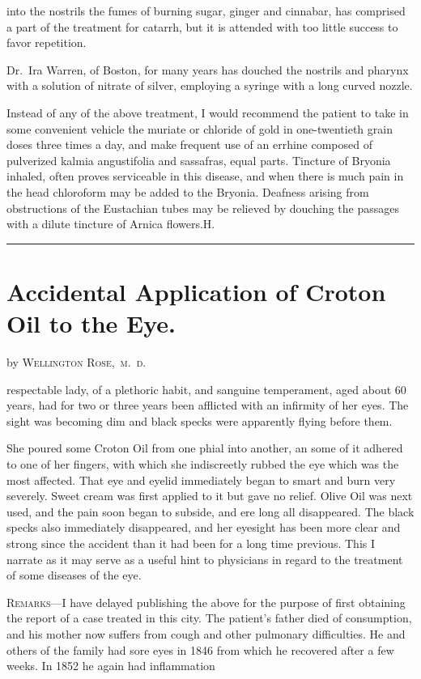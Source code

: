 into the nostrils the fumes of burning sugar, ginger and cinnabar,
has comprised a part of the treatment for catarrh, but it is attended
with too little success to favor repetition.

Dr.~Ira Warren, of Boston, for many years has douched the nostrils
and pharynx with a solution of nitrate of silver, employing a syringe
with a long curved nozzle.

Instead of any of the above treatment, I would recommend the patient
to take in some convenient vehicle the muriate or chloride of gold
in one-twentieth grain doses three times a day, and make frequent use
of an errhine composed of pulverized kalmia angustifolia and sassafras,
equal parts. Tincture of Bryonia inhaled, often proves serviceable in
this disease, and when there is much pain in the head chloroform may
be added to the Bryonia. Deafness arising from obstructions of the
Eustachian tubes may be relieved by douching the passages with a dilute
tincture of Arnica flowers.\hfill{}H.\quad{}

\fancybreak{* * *}

\section*{Accidental Application of Croton Oil to the Eye.}

by \textsc{Wellington Rose,\ m.~d.}

 respectable lady, of a plethoric habit, and sanguine temperament,
aged about 60 years, had for two or three years been afflicted
with an infirmity of her eyes. The sight was becoming dim and black
specks were apparently flying before them.

She poured some Croton Oil from one phial into another, an some
of it adhered to one of her fingers, with which she indiscreetly rubbed
the eye which was the most affected. That eye and eyelid immediately
began to smart and burn very severely. Sweet cream was first applied
to it but gave no relief. Olive Oil was next used, and the pain soon began
to subside, and ere long all disappeared. The black specks also immediately
disappeared, and her eyesight has been more clear and strong
since the accident than it had been for a long time previous. This I narrate
as it may serve as a useful hint to physicians in regard to the treatment
of some diseases of the eye.

\textsc{Remarks}---I have delayed publishing the above for the purpose of first
obtaining the report of a case treated in this city. The patient's father
died of consumption, and his mother now suffers from cough and other
pulmonary difficulties. He and others of the family had sore eyes in 1846
from which he recovered after a few weeks. In 1852 he again had inflammation\endinput
